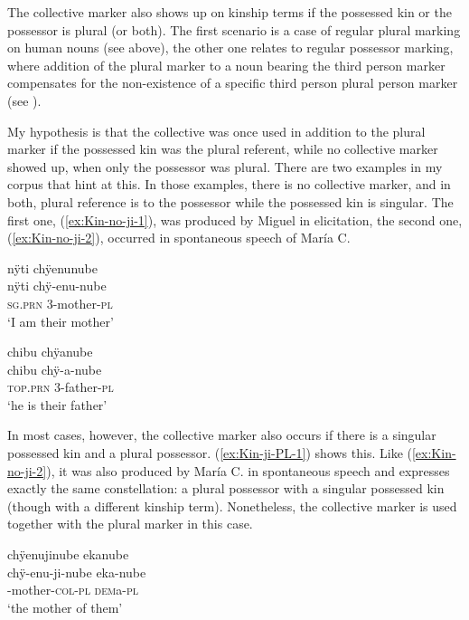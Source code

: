 The collective marker also shows up on kinship terms if the possessed kin or the possessor is plural (or both). The first scenario is a case of regular plural marking on human nouns (see  above), the other one relates to regular possessor marking, where addition of the plural marker to a noun bearing the third person marker compensates for the non-existence of a specific third person plural person marker (see ).

My hypothesis is that the collective was once used in addition to the plural marker if the possessed kin was the plural referent, while no collective marker showed up, when only the possessor was plural. There are two examples in my corpus that hint at this. In those examples, there is no collective marker, and in both, plural reference is to the possessor while the possessed kin is singular. The first one, (\ref{ex:Kin-no-ji-1}), was produced by Miguel in elicitation, the second one, (\ref{ex:Kin-no-ji-2}), occurred in spontaneous speech of María C.

\ea\label{ex:Kin-no-ji-1}
\begingl 
\glpreamble nÿti chÿenunube\\
\gla nÿti chÿ-enu-nube\\ 
\textsc{sg.prn} 3-mother-\textsc{pl}\\ 
\glft ‘I am their mother’\\ 
\endgl
\trailingcitation{[mxx-e090728s-3.081]}
\xe

\ea\label{ex:Kin-no-ji-2}
\begingl 
\glpreamble chibu chÿanube\\
\gla chibu chÿ-a-nube\\ 
\textsc{top.prn} 3-father-\textsc{pl}\\ 
\glft ‘he is their father’\\ 
\endgl
\trailingcitation{[cux-c120414ls-1.114]}
\xe

In most cases, however, the collective marker also occurs if there is a singular possessed kin and a plural possessor. (\ref{ex:Kin-ji-PL-1}) shows this. Like (\ref{ex:Kin-no-ji-2}), it was also produced by María C. in spontaneous speech and expresses exactly the same constellation: a plural possessor with a singular possessed kin (though with a different kinship term). Nonetheless, the collective marker is used together with the plural marker in this case.

\ea\label{ex:Kin-ji-PL-1}
\begingl 
\glpreamble chÿenujinube ekanube\\
\gla chÿ-enu-ji-nube eka-nube\\ 
-mother-\textsc{col}-\textsc{pl} \textsc{dem}a-\textsc{pl}\\ 
\glft ‘the mother of them’\\ 
\endgl
\trailingcitation{[cux-c120410ls.124]}
\xe

